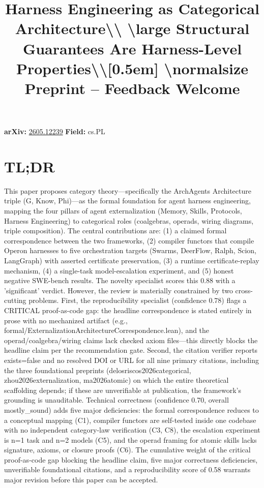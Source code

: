 \documentclass[11pt]{article}
\title{Harness Engineering as Categorical Architecture\textbackslash{}\textbackslash{} \textbackslash{}large Structural Guarantees Are Harness-Level Properties\textbackslash{}\textbackslash{}[0.5em] \textbackslash{}normalsize Preprint -- Feedback Welcome}
\date{}
\begin{document}
\maketitle

\noindent\textbf{arXiv:} \href{https://arxiv.org/abs/2605.12239}{2605.12239} \quad \textbf{Field:} cs.PL\\

\section*{TL;DR}
This paper proposes category theory—specifically the ArchAgents Architecture triple (G, Know, Phi)—as the formal foundation for agent harness engineering, mapping the four pillars of agent externalization (Memory, Skills, Protocols, Harness Engineering) to categorical roles (coalgebras, operads, wiring diagrams, triple composition). The central contributions are: (1) a claimed formal correspondence between the two frameworks, (2) compiler functors that compile Operon harnesses to five orchestration targets (Swarms, DeerFlow, Ralph, Scion, LangGraph) with asserted certificate preservation, (3) a runtime certificate-replay mechanism, (4) a single-task model-escalation experiment, and (5) honest negative SWE-bench results. The novelty specialist scores this 0.88 with a 'significant' verdict. However, the review is materially constrained by two cross-cutting problems. First, the reproducibility specialist (confidence 0.78) flags a CRITICAL proof-as-code gap: the headline correspondence is stated entirely in prose with no mechanized artifact (e.g., formal/ExternalizationArchitectureCorrespondence.lean), and the operad/coalgebra/wiring claims lack checked axiom files—this directly blocks the headline claim per the recommendation gate. Second, the citation verifier reports exists=false and no resolved DOI or URL for all nine primary citations, including the three foundational preprints (delosriscos2026categorical, zhou2026externalization, ma2026atomic) on which the entire theoretical scaffolding depends; if these are unverifiable at publication, the framework's grounding is unauditable. Technical correctness (confidence 0.70, overall mostly\_sound) adds five major deficiencies: the formal correspondence reduces to a conceptual mapping (C1), compiler functors are self-tested inside one codebase with no independent category-law verification (C3, C8), the escalation experiment is n=1 task and n=2 models (C5), and the operad framing for atomic skills lacks signature, axioms, or closure proofs (C6). The cumulative weight of the critical proof-as-code gap blocking the headline claim, five major correctness deficiencies, unverifiable foundational citations, and a reproducibility score of 0.58 warrants major revision before this paper can be accepted.
\end{document}
